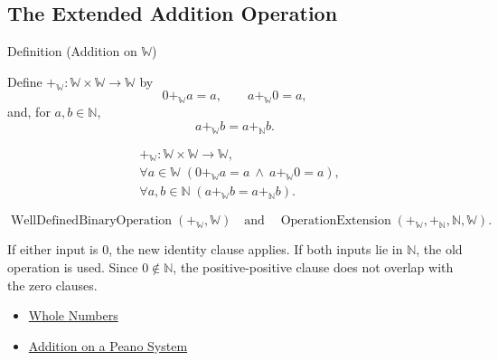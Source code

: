 \subsection*{The Extended Addition Operation}

\begin{definitionbox}{Definition (Addition on \texorpdfstring{$\mathbb{W}$}{W})}
\begin{definition}
\label{def:addition-on-w}
Define $+_{\mathbb{W}}:\mathbb{W}\times\mathbb{W}\to\mathbb{W}$ by
\[
0+_{\mathbb{W}}a=a,\qquad
a+_{\mathbb{W}}0=a,
\]
and, for $a,b\in\mathbb{N}$,
\[
a+_{\mathbb{W}}b=a+_{\mathbb{N}}b.
\]
\end{definition}
\end{definitionbox}

\begin{remark*}
\[
\begin{aligned}
&+_{\mathbb{W}}:\mathbb{W}\times\mathbb{W}\to\mathbb{W},\\
&\forall a\in\mathbb{W}\;(0+_{\mathbb{W}}a=a\ \wedge\ a+_{\mathbb{W}}0=a),\\
&\forall a,b\in\mathbb{N}\;
  (a+_{\mathbb{W}}b=a+_{\mathbb{N}}b).
\end{aligned}
\]
\end{remark*}

\begin{remark*}
\[
\operatorname{WellDefinedBinaryOperation}(+_{\mathbb{W}},\mathbb{W})
\quad\text{and}\quad
\operatorname{OperationExtension}
(+_{\mathbb{W}},+_{\mathbb{N}},\mathbb{N},\mathbb{W}).
\]
\end{remark*}

\begin{remark*}[Interpretation]
If either input is $0$, the new identity clause applies. If both inputs lie in
$\mathbb{N}$, the old operation is used. Since $0\notin\mathbb{N}$, the
positive-positive clause does not overlap with the zero clauses.
\end{remark*}

\begin{dependencies}
\begin{itemize}
  \item \hyperref[def:whole-numbers]{Whole Numbers}
  \item \hyperref[def:addition-on-peano-system]{Addition on a Peano System}
\end{itemize}
\end{dependencies}

